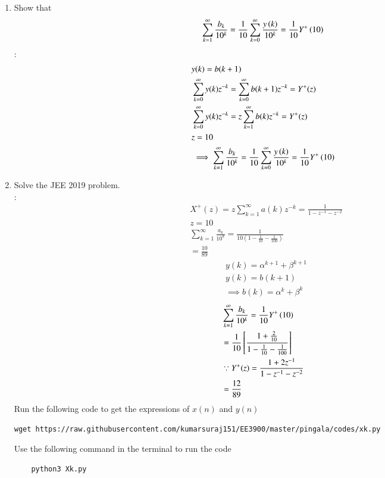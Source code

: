 \documentclass[journal,12pt,twocolumn]{IEEEtran}
\renewcommand\thesection{\arabic{section}}
\begin{document}
\begin{enumerate}[label=\thesection.\arabic*,ref=\thesection.\theenumi]
 \item Show that 
\begin{align}
	\sum_{k=1}^{\infty}\frac{b_k}{10^k} =
	\frac{1}{10}\sum_{k=0}^{\infty}\frac{y\left(k\right)}{10^k} =\frac{1}{10}Y^{+}\left({10}\right)
\end{align}
\solution:
\begin{align}
	&y(k)=b(k+1)\\
	&\sum_{k=0}^{\infty} y(k) z^{-k}=\sum_{k=0}^{\infty} b(k+1) z^{-k}=Y^{+}(z)\\
	&\sum_{k=0}^{\infty} y(k) z^{-k}=z\sum_{k=1}^{\infty} b(k) z^{-k}=Y^{+}(z)\\
	&z=10\\
	&\implies \sum_{k=1}^{\infty}\frac{b_k}{10^k} =
	\frac{1}{10}\sum_{k=0}^{\infty}\frac{y\left(k\right)}{10^k} =\frac{1}{10}Y^{+}\left({10}\right)
\end{align}
\item Solve the JEE 2019 problem.\\
\solution:
\begin{align}
	&X^{+}(z)=z\sum_{k=1}^{\infty} a(k) z^{-k}=\frac{1}{1-z^{-1}-z^{-2}}\\
	&z=10\\
	&\sum_{k=1}^{\infty} \frac{a_k}{10^k}=\frac{1}{10 \left(1-\frac{1}{10}-\frac{1}{100}\right)}\\
	&=\frac{10}{89}
\end{align}
\begin{align}
	&y(k)=\alpha^{k+1}+\beta^{k+1}\\
	&y(k)=b(k+1)\\
	&\implies b(k)=\alpha^{k}+\beta^{k}
\end{align}
\begin{align}
	&\sum_{k=1}^{\infty}\frac{b_k}{10^k} =\frac{1}{10}Y^{+}\left({10}\right)\\
	&=\frac{1}{10}\left[\frac{1+\frac{2}{10}}{1-\frac{1}{10}-\frac{1}{100}}\right]\\
	&\because Y^{+}(z)=\frac{1+2z^{-1}}{1-z^{-1}-z^{-2}}\\
	&=\frac{12}{89}
\end{align}
Run the following code to get the expressions of $x(n)$ and $y(n)$
\begin{lstlisting}
wget https://raw.githubusercontent.com/kumarsuraj151/EE3900/master/pingala/codes/xk.py
\end{lstlisting}
Use the following command in the terminal to run the code
\begin{lstlisting}
	python3 Xk.py
\end{lstlisting}

\end{enumerate}
\end{document}

